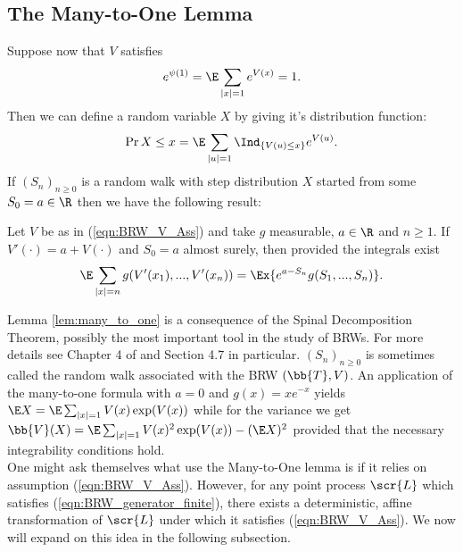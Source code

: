\subsection{The Many-to-One Lemma}

Suppose now that $V$ satisfies
\begin{equation}\label{eqn:BRW_V_Ass}
e^{\psi(1)} = \E \sum\limits_{|x|=1} e^{V(x)} = 1. 
\end{equation}
Then we can define a random variable $X$ by giving it's distribution function: 
\begin{equation}
\Pr{X \leq x} = \E \sum\limits_{|u| = 1} \Ind_{\{V(u) \leq x\}} e^{V(u)}. 
\end{equation}
If $(S_n)_{n\geq0}$ is a random walk with step distribution $X$ started from some $S_0 = a \in \R$ then we have the following result:
\begin{lemma}\label{lem:many_to_one}
Let $V$ be as in (\ref{eqn:BRW_V_Ass}) and take $g$ measurable, $a \in \R$ and $n \geq 1$. If $V'(\cdot) = a + V(\cdot)$ and $S_0 = a$ almost surely, then provided the integrals exist 
\begin{equation}
\E \sum\limits_{|x| = n} g(V'(x_1), ...,V'(x_n)) = \Ex{e^{a-S_n} g(S_1, ...,S_n)}. 
\end{equation}
\end{lemma}

Lemma \ref{lem:many_to_one} is a consequence of the Spinal Decomposition Theorem, possibly the most important tool in the study of BRWs. For more details see Chapter 4 of \cite{shi2015branching} and Section 4.7 in particular. $(S_n)_{n\geq0}$ is sometimes called the random walk associated with the BRW $(\bb{T}, V)$. An application of the many-to-one formula with $a=0$ and $g(x) = x e^{-x}$ yields $\E X = \E \sum_{|x|=1} V(x) \exp(V(x))$ while for the variance we get $\bb{V}(X) = \E \sum_{|x|=1} V(x)^2 \exp(V(x)) - (\E X)^2$ provided that the necessary integrability conditions hold. \\

One might ask themselves what use the Many-to-One lemma is if it relies on assumption (\ref{eqn:BRW_V_Ass}). However, for any point process $\scr{L}$ which satisfies (\ref{eqn:BRW_generator_finite}), there exists a deterministic, affine transformation of $\scr{L}$ under which it satisfies (\ref{eqn:BRW_V_Ass}). We now will expand on this idea in the following subsection. 







